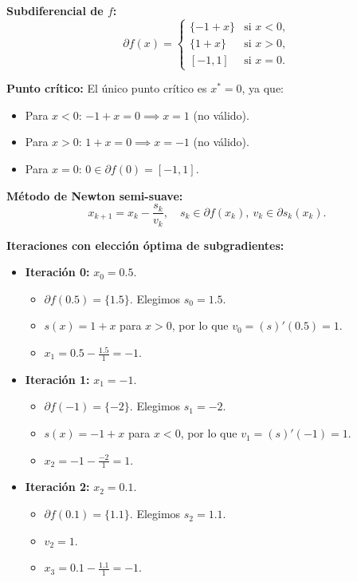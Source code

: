 \documentclass[12pt]{book}
\theoremstyle{definition}
\theoremstyle{plain}
\theoremstyle{remark}
\begin{document}
\medskip
\textbf{Subdiferencial de \( f \):}
\[
\partial f(x) =
\begin{cases}
\{-1 + x\} & \text{si } x < 0, \\
\{1 + x\} & \text{si } x > 0, \\
[-1, 1] & \text{si } x = 0.
\end{cases}
\]

\medskip
\textbf{Punto crítico:}
El único punto crítico es \( x^* = 0 \), ya que:
\begin{itemize}
    \item Para \( x < 0 \): \( -1 + x = 0 \implies x = 1 \) (no válido).
    \item Para \( x > 0 \): \( 1 + x = 0 \implies x = -1 \) (no válido).
    \item Para \( x = 0 \): \( 0 \in \partial f(0) = [-1, 1] \).
\end{itemize}

\medskip
\textbf{Método de Newton semi-suave:}
\[
x_{k+1} = x_k - \frac{s_k}{v_k}, \quad s_k \in \partial f(x_k), \ v_k \in \partial s_k(x_k).
\]

\medskip
\textbf{Iteraciones con elección óptima de subgradientes:}
\begin{itemize}
    \item \textbf{Iteración 0:} \( x_0 = 0.5 \).
      \begin{itemize}
        \item \( \partial f(0.5) = \{1.5\} \). Elegimos \( s_0 = 1.5 \).
        \item \( s(x) = 1 + x \) para \( x > 0 \), por lo que \( v_0 = (s)' (0.5) = 1 \).
        \item \( x_1 = 0.5 - \frac{1.5}{1} = -1 \).
      \end{itemize}

    \item \textbf{Iteración 1:} \( x_1 = -1 \).
      \begin{itemize}
        \item \( \partial f(-1) = \{-2\} \). Elegimos \( s_1 = -2 \).
        \item \( s(x) = -1 + x \) para \( x < 0 \), por lo que \( v_1 = (s)' (-1) = 1 \).
        \item \( x_2 = -1 - \frac{-2}{1} = 1 \).
      \end{itemize}

    \item \textbf{Iteración 2:} \( x_2 = 0.1 \).
      \begin{itemize}
        \item \( \partial f(0.1) = \{1.1\} \). Elegimos \( s_2 = 1.1 \).
        \item \( v_2 = 1 \).
        \item \( x_3 = 0.1 - \frac{1.1}{1} = -1 \).
      \end{itemize}
\end{itemize}
\end{document}
